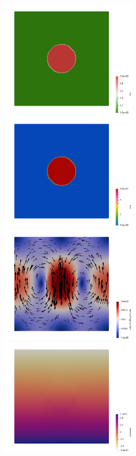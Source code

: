 \begin{center}
\includegraphics[width=7cm]{python_codes/fieldstone_158/results/exp1/rho}
\includegraphics[width=7cm]{python_codes/fieldstone_158/results/exp1/eta}\\
\includegraphics[width=7cm]{python_codes/fieldstone_158/results/exp1/vel}
\includegraphics[width=7cm]{python_codes/fieldstone_158/results/exp1/press}
\end{center} 

